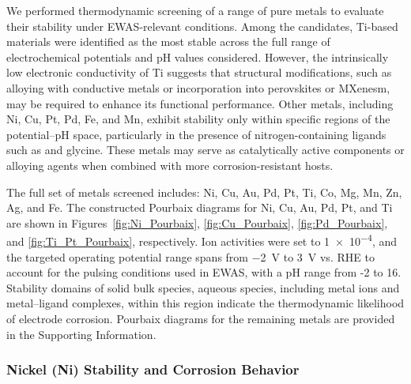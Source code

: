 \documentclass[journal=jacsat,manuscript=article]{achemso}
\begin{document}
We performed thermodynamic screening of a range of pure metals to evaluate their stability under EWAS-relevant conditions. Among the candidates, Ti-based materials were identified as the most stable across the full range of electrochemical potentials and pH values considered. However, the intrinsically low electronic conductivity of Ti suggests that structural modifications, such as alloying with conductive metals or incorporation into perovskites or MXenesm, may be required to enhance its functional performance. Other metals, including Ni, Cu, Pt, Pd, Fe, and Mn, exhibit stability only within specific regions of the potential–pH space, particularly in the presence of nitrogen-containing ligands such as  and glycine. These metals may serve as catalytically active components or alloying agents when combined with more corrosion-resistant hosts. 

The full set of metals screened includes: Ni, Cu, Au, Pd, Pt, Ti, Co, Mg, Mn, Zn, Ag, and Fe. The constructed Pourbaix diagrams for Ni, Cu, Au, Pd, Pt, and Ti are shown in Figures~\ref{fig:Ni_Pourbaix}, \ref{fig:Cu_Pourbaix}, \ref{fig:Pd_Pourbaix}, and \ref{fig:Ti_Pt_Pourbaix}, respectively. Ion activities were set to \SI{1e-4}{\molar}, and the targeted operating potential range spans from \SI{-2}{V} to \SI{3}{V} vs. RHE to account for the pulsing conditions used in EWAS, with a pH range from -2 to 16. Stability domains of solid bulk species, aqueous species, including metal ions and metal–ligand complexes, within this region indicate the thermodynamic likelihood of electrode corrosion. Pourbaix diagrams for the remaining metals are provided in the Supporting Information.




\subsubsection{Nickel (Ni) Stability and Corrosion Behavior}
\end{document}
